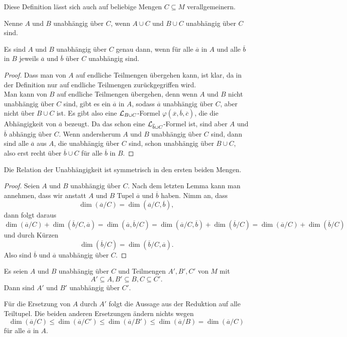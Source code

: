 Diese Definition lässt sich auch auf beliebige Mengen $C\subseteq M$ verallgemeinern.
\begin{definition}
	Nenne $A$ und $B$ unabhängig über $C$, wenn $A\cup C$ und $B\cup C$ unabhängig über $C$ sind.
\end{definition}

\begin{lemma}
	Es sind $A$ und $B$ unabhängig über $C$ genau dann, wenn für alle $\overline{a}$ in $A$ und alle $\overline{b}$ in $B$ jeweils $\overline{a}$ und $\overline{b}$ über $C$ unabhängig sind.
\end{lemma}
\begin{proof}
	Dass man von $A$ auf endliche Teilmengen übergehen kann, ist klar, da in der Definition nur auf endliche Teilmengen zurückgegriffen wird.\\
	Man kann von $B$ auf endliche Teilmengen übergehen, denn wenn $A$ und $B$ nicht unabhängig über $C$ sind, gibt es ein $\overline{a}$ in $A$, sodass $\overline{a}$ unabhängig über $C$, aber nicht über $B\cup C$ ist. Es gibt also eine $\mathcal{L}_{B\cup C}$-Formel $\varphi(\overline{x},\overline{b},\overline{c})$, die die Abhängigkeit von $\overline{a}$ bezeugt. Da das schon eine $\mathcal{L}_{\overline{b}\cup C}$-Formel ist, sind aber $A$ und $\overline{b}$ abhängig über $C$. Wenn andersherum $A$ und $B$ unabhängig über $C$ sind, dann sind alle $\overline{a}$ aus $A$, die unabhängig über $C$ sind, schon unabhängig über $B\cup C$, also erst recht über $\overline{b}\cup C$ für alle $\overline{b}$ in $B$.
\end{proof}

\begin{lemma}
	Die Relation der Unabhängigkeit ist symmetrisch in den ersten beiden Mengen.
\end{lemma}
\begin{proof}
	Seien $A$ und $B$ unabhängig über $C$. Nach dem letzten Lemma kann man annehmen, dass wir anstatt $A$ und $B$ Tupel $\overline{a}$ und $\overline{b}$ haben. Nimm an, dass $$\dim(\overline{a}/C)=\dim(\overline{a}/C,\overline{b}),$$
	dann folgt daraus $$\dim(\overline{a}/C)+\dim(\overline{b}/C,\overline{a})=\dim(\overline{a},\overline{b}/C)=\dim(\overline{a}/C,\overline{b})+\dim(\overline{b}/C)=\dim(\overline{a}/C)+\dim(\overline{b}/C)$$ und durch Kürzen $$\dim(\overline{b}/C)=\dim(\overline{b}/C,\overline{a}).$$
	Also sind $\overline{b}$ und $\overline{a}$ unabhängig über $C$.
\end{proof}

\begin{lemma}
	Es seien $A$ und $B$ unabhängig über $C$ und Teilmengen $A',B',C'$ von $M$ mit $$A'\subseteq A,B'\subseteq B,C\subseteq C'.$$
	Dann sind $A'$ und $B'$ unabhängig über $C'$.
\end{lemma}
\begin{lemma}
	Für die Ersetzung von $A$ durch $A'$ folgt die Aussage aus der Reduktion auf alle Teiltupel. Die beiden anderen Ersetzungen ändern nichts wegen
	$$\dim(\overline{a}/C)\leq\dim(\overline{a}/C')\leq\dim(\overline{a}/B')\leq\dim(\overline{a}/B)=\dim(\overline{a}/C)$$ für alle $\overline{a}$ in $A$.
\end{lemma}

